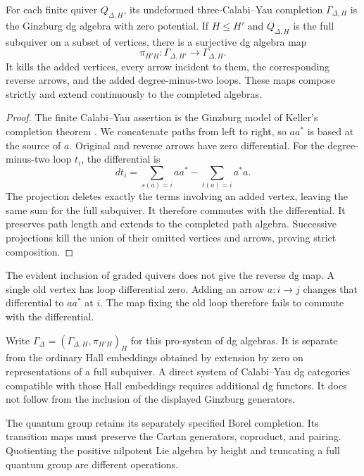\begin{theorem}
For each finite quiver \(Q_{\Delta,H}\), its undeformed
three-Calabi--Yau completion \(\Gamma_{\Delta,H}\) is the
Ginzburg dg algebra with zero potential. If \(H\le H'\) and
\(Q_{\Delta,H}\) is the full subquiver on a subset of vertices,
there is a surjective dg algebra map
\[
 \pi_{H'H}:\Gamma_{\Delta,H'}\longrightarrow\Gamma_{\Delta,H}.
\]
It kills the added vertices, every arrow incident to them, the
corresponding reverse arrows, and the added degree-minus-two loops.
These maps compose strictly and extend continuously to the completed algebras.
\end{theorem}
\begin{proof}
The finite Calabi--Yau assertion is the Ginzburg model of Keller's
completion theorem \cite{KellerCY,GinzburgCY}. We concatenate
paths from left to right, so \(aa^*\) is based at the source
of \(a\). Original and reverse arrows have zero differential.
For the degree-minus-two loop \(t_i\), the differential is
\[
 d t_i=\sum_{s(a)=i}aa^*-\sum_{t(a)=i}a^*a.
\]
The projection deletes exactly the terms involving an added vertex,
leaving the same sum for the full subquiver. It therefore commutes
with the differential. It preserves path length and extends to the
completed path algebra. Successive projections kill the union of
their omitted vertices and arrows, proving strict composition.
\end{proof}

The evident inclusion of graded quivers does not give the reverse
dg map. A single old vertex has loop differential zero. Adding
an arrow \(a:i\to j\) changes that differential to \(aa^*\)
at \(i\). The map fixing the old loop therefore fails to commute
with the differential.

Write \(\Gamma_\Delta=(\Gamma_{\Delta,H},\pi_{H'H})_H\)
for this pro-system of dg algebras. It is separate from the
ordinary Hall embeddings obtained by extension by zero on
representations of a full subquiver. A direct system of
Calabi--Yau dg categories compatible with those Hall embeddings
requires additional dg functors. It does not follow from the
inclusion of the displayed Ginzburg generators.

The quantum group retains its separately specified Borel
completion. Its transition maps must preserve the Cartan generators,
coproduct, and pairing. Quotienting the positive nilpotent Lie
algebra by height and truncating a full quantum group are different
operations.


